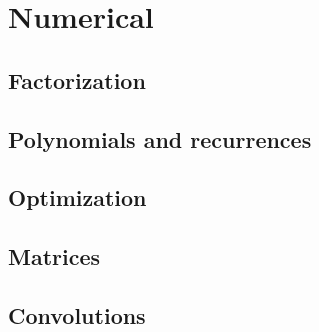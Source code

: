 \chapter{Numerical}

\section{Factorization}

\section{Polynomials and recurrences}

\section{Optimization}

\section{Matrices}

\section{Convolutions}

